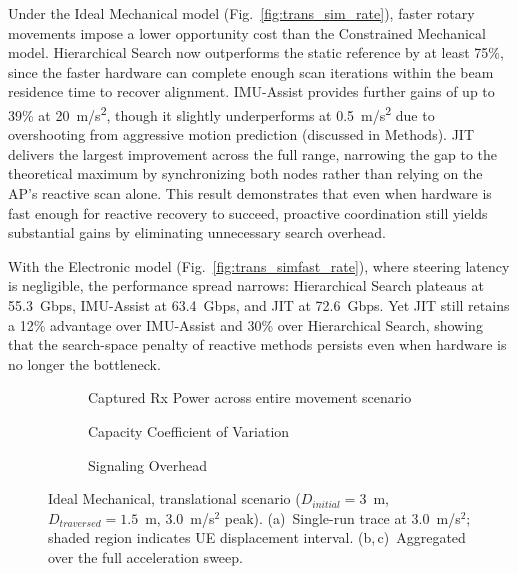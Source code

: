 \documentclass[fleqn,10pt]{wlscirep}
\begin{document}
Under the Ideal Mechanical model (Fig.~\ref{fig:trans_sim_rate}), faster rotary movements impose a lower opportunity cost than the Constrained Mechanical model. Hierarchical Search now outperforms the static reference by at least 75\%, since the faster hardware can complete enough scan iterations within the beam residence time to recover alignment. IMU-Assist provides further gains of up to 39\% at \SI{20}{m/s^2}, though it slightly underperforms at \SI{0.5}{m/s^2} due to overshooting from aggressive motion prediction (discussed in Methods). JIT delivers the largest improvement across the full range, narrowing the gap to the theoretical maximum by synchronizing both nodes rather than relying on the AP's reactive scan alone. This result demonstrates that even when hardware is fast enough for reactive recovery to succeed, proactive coordination still yields substantial gains by eliminating unnecessary search overhead.

With the Electronic model (Fig.~\ref{fig:trans_simfast_rate}), where steering latency is negligible, the performance spread narrows: Hierarchical Search plateaus at \SI{55.3}{Gbps}, IMU-Assist at \SI{63.4}{Gbps}, and JIT at \SI{72.6}{Gbps}. Yet JIT still retains a 12\% advantage over IMU-Assist and 30\% over Hierarchical Search, showing that the search-space penalty of reactive methods persists even when hardware is no longer the bottleneck.

\begin{figure}[ht!]
    \centering
    \begin{subfigure}[t]{0.475\textwidth}
        \vspace{0pt}
        \centering
        
        \vspace{-20pt}
        \caption{Captured Rx Power across entire movement scenario}
        \label{fig:trans_metrics_example}
    \end{subfigure}%
    \hfill
    \begin{minipage}[t]{0.475\textwidth}
        \vspace{0pt}
        \centering
        \begin{subfigure}{\linewidth}
            
            \vspace{-15pt}
            \caption{Capacity Coefficient of Variation}
            \label{fig:trans_metrics_covariance}
        \end{subfigure}
        \vfill
            \begin{subfigure}{\linewidth}
            
            \vspace{-15pt}
            \caption{Signaling Overhead}
            \label{fig:trans_metrics_overhead}
        \end{subfigure}
    \end{minipage}
    \caption{Ideal Mechanical, translational scenario ($D_{initial} = 3$~m, $D_{traversed} = 1.5$~m, $3.0$~m/s$^2$ peak). (a)~Single-run trace at $3.0$~m/s$^2$; shaded region indicates UE displacement interval. (b,\,c)~Aggregated over the full acceleration sweep.}
    \label{fig:translational_metrics}
    \vspace{-5pt}
\end{figure}
\end{document}
